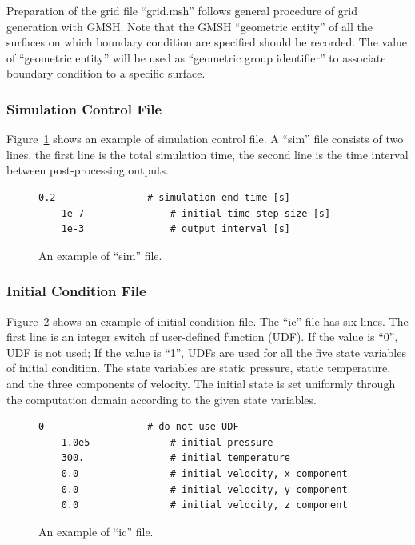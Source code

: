 \documentclass[]{article}
\begin{document}
Preparation of the grid file ``grid.msh'' follows general procedure of grid generation with GMSH.
Note that the GMSH ``geometric entity'' of all the surfaces on which boundary condition are
specified should be recorded.
The value of ``geometric entity'' will be used as ``geometric group identifier'' to associate
boundary condition to a specific surface.

\subsubsection{Simulation Control File}

Figure~\ref{lst:sim} shows an example of simulation control file.
A ``sim'' file consists of two lines, the first line is the total simulation time, the second line
is the time interval between post-processing outputs.

\begin{figure}[h!]
  \begin{lstlisting}[backgroundcolor=\color{lightgray}]
    0.2                # simulation end time [s]
    1e-7               # initial time step size [s]
    1e-3               # output interval [s]
  \end{lstlisting}
  \caption{An example of ``sim'' file.}
  \label{lst:sim}
\end{figure}

\subsubsection{Initial Condition File}

Figure~\ref{lst:ic} shows an example of initial condition file.
The ``ic'' file has six lines.
The first line is an integer switch of user-defined function (UDF).
If the value is ``0'', UDF is not used;
If the value is ``1'', UDFs are used for all the five state variables of initial condition.
The state variables are static pressure, static temperature, and the three components of velocity.
The initial state is set uniformly through the computation domain according to the given state
variables.

\begin{figure}[h!]
  \begin{lstlisting}[backgroundcolor=\color{lightgray}]
    0                  # do not use UDF
    1.0e5              # initial pressure
    300.               # initial temperature
    0.0                # initial velocity, x component
    0.0                # initial velocity, y component
    0.0                # initial velocity, z component
  \end{lstlisting}
  \caption{An example of ``ic'' file.}
  \label{lst:ic}
\end{figure}
\end{document}
